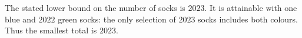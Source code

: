 The stated lower bound on the number of socks is $2023$. It is attainable with one blue and $2022$ green socks: the only selection of $2023$ socks includes both colours. Thus the smallest total is $\boxed{2023}$.
